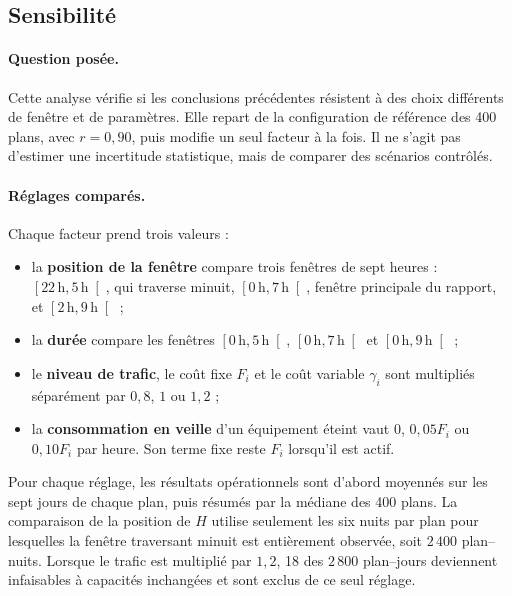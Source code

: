 \FloatBarrier

\subsection{Sensibilité}
\label{subsec:sensibilite_mecanismes}

\paragraph{Question posée.}
Cette analyse vérifie si les conclusions précédentes résistent à des choix
différents de fenêtre et de paramètres. Elle repart de la configuration de
référence des 400 plans, avec \(r=0{,}90\), puis modifie un seul facteur à la
fois. Il ne s'agit pas d'estimer une incertitude statistique, mais de comparer
des scénarios contrôlés.

\paragraph{Réglages comparés.}
Chaque facteur prend trois valeurs :
\begin{itemize}
    \item la \textbf{position de la fenêtre} compare trois fenêtres de sept
    heures :
    \(\left[22\,\mathrm h,5\,\mathrm h\right[\), qui traverse minuit,
    \(\left[0\,\mathrm h,7\,\mathrm h\right[\), fenêtre principale du rapport, et
    \(\left[2\,\mathrm h,9\,\mathrm h\right[\) ;
    \item la \textbf{durée} compare les fenêtres
    \(\left[0\,\mathrm h,5\,\mathrm h\right[\),
    \(\left[0\,\mathrm h,7\,\mathrm h\right[\) et
    \(\left[0\,\mathrm h,9\,\mathrm h\right[\) ;
    \item le \textbf{niveau de trafic}, le coût fixe \(F_i\) et le coût
    variable \(\gamma_i\) sont multipliés séparément par
    \(0{,}8\), \(1\) ou \(1{,}2\) ;
    \item la \textbf{consommation en veille} d'un équipement éteint vaut
    \(0\), \(0{,}05F_i\) ou \(0{,}10F_i\) par heure. Son terme fixe reste
    \(F_i\) lorsqu'il est actif.
\end{itemize}

Pour chaque réglage, les résultats opérationnels sont d'abord moyennés sur
les sept jours de chaque plan, puis résumés par la médiane des 400 plans. La
comparaison de la position de \(H\) utilise seulement les six nuits par plan
pour lesquelles la fenêtre traversant minuit est entièrement observée, soit
\(2\,400\) plan--nuits. Lorsque le trafic est multiplié par \(1{,}2\), 18 des
\(2\,800\) plan--jours deviennent infaisables à capacités inchangées et sont
exclus de ce seul réglage.

